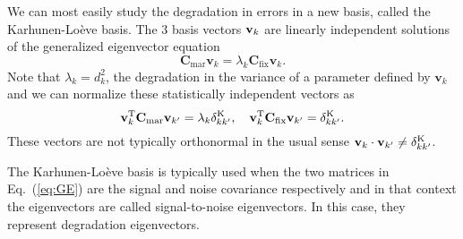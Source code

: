 \documentclass[prd,twocolumn,amsmath,amssymb,floatfix,superscriptaddress]{revtex4-1}
\begin{document}
{{We can most easily study the degradation in errors in a new basis, called the
Karhunen-Lo\`{e}ve basis.   The 3 basis
vectors ${\bf v}_{k}$ are linearly independent solutions of the generalized eigenvector equation
   \begin{equation}
    \mathbf{C}_\textrm{mar} \mathbf{v}_{k} = \lambda_{k} \mathbf{C}_\textrm{fix} \mathbf{v}_{k}.
      \label{eq:GE}
\end{equation}
Note that $\lambda_{k} = d_{k}^2$, the degradation in the variance of
a parameter defined by $\mathbf{v}_{k}$ and we can normalize these statistically
independent vectors as
\begin{equation}
    {\bf v}_{k}^\mathrm{T} \mathbf{C}_\textrm{mar} {\bf v}_{k'} = \lambda_{k} \delta_{kk'}^{\rm K}, \quad
    {\bf v}_{k}^\mathrm{T} \mathbf{C}_\textrm{fix} {\bf v}_{k'} = \delta_{kk'}^{\rm K}.
\end{equation}
These vectors are not typically orthonormal
in the usual sense ${\bf v}_k \cdot {\bf v}_{k'} \ne \delta_{kk'}^{\rm K}$.

The Karhunen-Lo\`{e}ve basis is typically used when the two matrices in Eq.~(\ref{eq:GE})
are the signal and noise covariance respectively and in that context the eigenvectors
are called signal-to-noise eigenvectors.  In this case, they represent degradation eigenvectors.


}}
\end{document}

